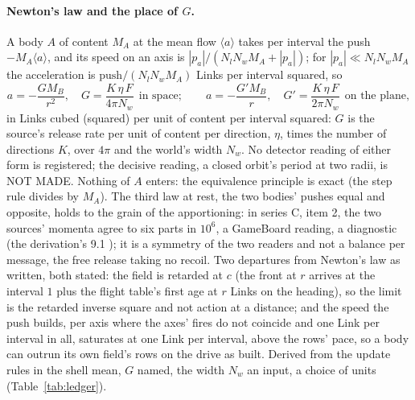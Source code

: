 \paragraph{Newton's law and the place of $G$.} A body $A$ of content
$M_A$ at the mean flow $\langle a\rangle$ takes per interval the push
$-M_A\langle a\rangle$, and its speed on an axis is $|p_a|/(N_l N_w M_A +
|p_a|)$; for $|p_a| \ll N_l N_w M_A$ the acceleration is
$\mathrm{push}/(N_l N_w M_A)$ Links per interval squared, so
\begin{equation}\label{eq:newton}
a = -\frac{G M_B}{r^2}, \quad G = \frac{K\,\eta\,F}{4\pi N_w}\ \ \text{in space};
\qquad a = -\frac{G' M_B}{r}, \quad G' = \frac{K\,\eta\,F}{2\pi N_w}\ \ \text{on the plane},
\end{equation}
in Links cubed (squared) per unit of content per interval squared: $G$
is the source's release rate per unit of content per direction, $\eta$,
times the number of directions $K$, over $4\pi$ and the world's width
$N_w$. No detector reading of either form is registered; the decisive reading, a closed orbit's period at two radii, is NOT MADE.
Nothing of $A$ enters: the equivalence principle is exact (the step rule
divides by $M_A$). The third law at rest, the two bodies' pushes equal and opposite, holds to the grain of the apportioning: in series C, item 2, the two sources' momenta agree to six parts in $10^6$, a GameBoard reading, a diagnostic (the derivation's 9.1 \cite{derivations}); it is a symmetry of the two readers and not a balance per message, the free release taking no recoil. Two departures from Newton's law as written, both stated:
the field is retarded at $c$ (the front at $r$ arrives at the interval
$1$ plus the flight table's first age at $r$ Links on the heading), so
the limit is the retarded inverse square and not
action at a distance; and the speed the push builds, per axis where the axes' fires do not coincide and one Link per interval in all, saturates at one Link per interval, above the rows' pace, so a body can outrun its own field's rows on the drive as built. Derived from the update rules in the shell mean, $G$ named, the width $N_w$ an input, a choice of units (Table~\ref{tab:ledger}).

